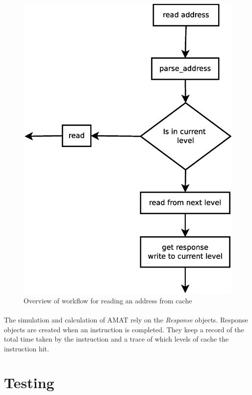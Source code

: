 \documentclass[11pt]{article}
\begin{document}
\begin{figure}[htp!]
\centering
\includegraphics[scale=0.40]{read_diagram.eps}
\caption{Overview of workflow for reading an address from cache}
\label{}
\end{figure}

\pagebreak
\paragraph{}
The simulation and calculation of AMAT rely on the \textit{Response} objects. Response objects are created when an instruction is completed. They keep a record of the total time taken by the instruction and a trace of which levels of cache the instruction hit. 

\section{Testing}
\end{document}
